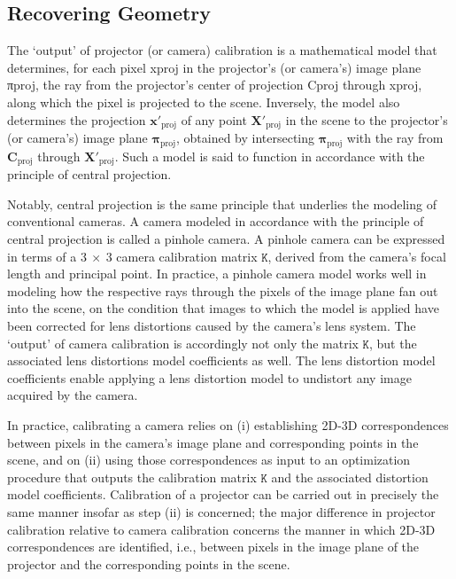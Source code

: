 \documentclass[review]{elsarticle}
\begin{document}
\subsection{Recovering Geometry}\label{sec:approach:geometry}

The `output' of projector (or camera) calibration is a mathematical model that determines, for each pixel xproj in the projector's (or camera's) image plane πproj, the ray from the projector’s center of projection Cproj through xproj, along which the pixel is projected to the scene. Inversely, the model also determines the projection $\mathbf{x}'_\text{proj}$ of any point $\mathbf{X}'_\text{proj}$ in the scene to the projector's (or camera's) image plane $\mathbf{\pi}_\text{proj}$, obtained by intersecting $\mathbf{\pi}_\text{proj}$ with the ray from $\mathbf{C}_\text{proj}$ through $\mathbf{X}'_\text{proj}$. Such a model is said to function in accordance with the principle of central projection.

Notably, central projection is the same principle that underlies the modeling of conventional cameras. A camera modeled in accordance with the principle of central projection is called a pinhole camera. A pinhole camera can be expressed in terms of a $3~\times~3$ camera calibration matrix $\mathtt{K}$,  derived from the camera's focal length and principal point. In practice, a pinhole camera model works well in modeling how the respective rays through the pixels of the image plane fan out into the scene, on the condition that images to which the model is applied have been corrected for lens distortions caused by the camera’s lens system. The `output' of camera calibration is accordingly not only the matrix $\mathtt{K}$, but the associated lens distortions model coefficients as well. The lens distortion model coefficients enable applying a lens distortion model to undistort any image acquired by the camera.

In practice, calibrating a camera relies on (i) establishing 2D-3D correspondences between pixels in the camera's image plane and corresponding points in the scene, and on (ii) using those correspondences as input to an optimization procedure that outputs the calibration matrix $\mathtt{K}$ and the associated distortion model coefficients. Calibration of a projector can be carried out in precisely the same manner insofar as step (ii) is concerned; the major difference in projector calibration relative to camera calibration concerns the manner in which 2D-3D correspondences are identified, i.e., between pixels in the image plane of the projector and the corresponding points in the scene.
\end{document}

